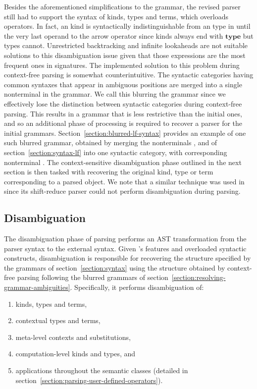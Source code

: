 Besides the aforementioned simplifications to the grammar, the revised parser still had to support the syntax of \LF kinds, types and terms, which overloads operators.
In fact, an \LF kind is syntactically indistinguishable from an \LF type in \Beluga until the very last operand to the arrow operator since kinds always end with $\mathbf{type}$ but types cannot.
Unrestricted backtracking and infinite lookaheads are not suitable solutions to this disambiguation issue given that those expressions are the most frequent ones in \Beluga signatures.
The implemented solution to this problem during context-free parsing is somewhat counterintuitive.
The syntactic categories having common syntaxes that appear in ambiguous positions are merged into a single nonterminal in the grammar.
We call this blurring the grammar since we effectively lose the distinction between syntactic categories during context-free parsing.
This results in a grammar that is less restrictive than the initial ones, and so an additional phase of processing is required to recover a parser for the initial grammars.
Section~\ref{section:blurred-lf-syntax} provides an example of one such blurred grammar, obtained by merging the nonterminals ,  and  of section~\ref{section:syntax-lf} into one syntactic category, with corresponding nonterminal .
The context-sensitive disambiguation phase outlined in the next section is then tasked with recovering the original \LF kind, type or term corresponding to a parsed \LF object.
We note that a similar technique was used in \Twelf since its shift-reduce parser could not perform disambiguation during parsing.

\subsection{Disambiguation}

The disambiguation phase of parsing performs an \ac{AST} transformation from the parser syntax to the external syntax.
Given \Beluga's features and overloaded syntactic constructs, disambiguation is responsible for recovering the structure specified by the grammars of section~\ref{section:syntax} using the structure obtained by context-free parsing following the blurred grammars of section~\ref{section:resolving-grammar-ambiguities}.
Specifically, it performs disambiguation of:
\begin{enumerate}
\item \LF kinds, types and terms,
\item contextual \LF types and terms,
\item meta-level contexts and substitutions,
\item computation-level kinds and types, and
\item applications throughout the semantic classes (detailed in section~\ref{section:parsing-user-defined-operators}).
\end{enumerate}

